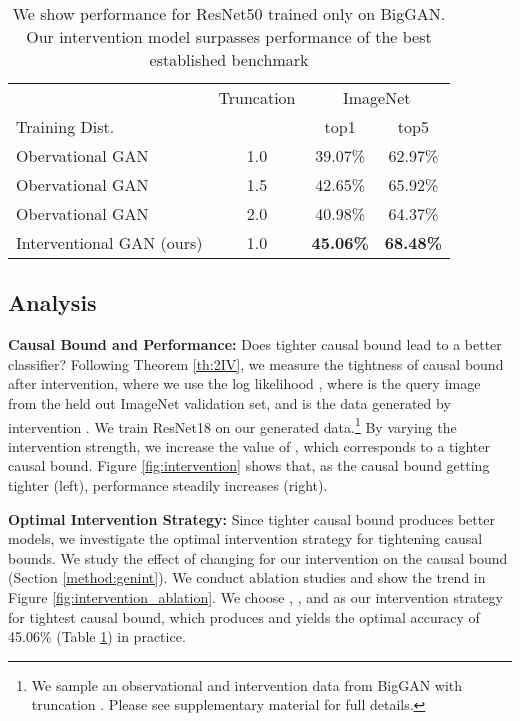\documentclass[final]{cvpr}
\begin{document}
\begin{table}
\centering
    \centering
    \scriptsize
    \begin{tabular}{lc|cc}
         \toprule
         & Truncation & \multicolumn{2}{c}{ImageNet}  \\
          Training Dist.& & top1&top5\\
         \midrule  
Obervational GAN \cite{CAS}  & 1.0 & 39.07\% & 62.97\%  \\
Obervational GAN \cite{CAS} & 1.5 & 42.65\% & 65.92\% \\
         Obervational GAN \cite{CAS} & 2.0 & 40.98\% & 64.37\%\\
         Interventional GAN (ours) & 1.0 & \textbf{45.06\%} & \textbf{68.48\%}\\
\bottomrule
    \end{tabular}
\vspace{3px}
\caption{We show performance for ResNet50 trained only on BigGAN. Our intervention model surpasses performance of the best established benchmark \cite{CAS}} \label{tab:CAS}
    \vspace{-5mm}
\end{table}

\subsection{Analysis}\label{sec:int_effect}





\textbf{Causal Bound and Performance:} Does tighter causal bound lead to a better classifier? Following Theorem \ref{th:2IV}, we measure the tightness of causal bound after intervention, where we use the log likelihood , where  is the query image from the held out ImageNet validation set, and  is the data generated by intervention . We train ResNet18 on our generated data.\footnote{We sample an observational and intervention data from BigGAN with truncation  \cite{BigGAN}.  Please see supplementary material for full details. }
By varying the intervention strength, we increase the value of , which corresponds to a tighter causal bound. Figure \ref{fig:intervention} shows that, as the causal bound getting tighter (left), performance steadily increases (right). 



\textbf{Optimal Intervention Strategy:} Since tighter causal bound produces better models, we investigate the optimal intervention strategy for tightening causal bounds. We study the effect of changing  for our intervention on the causal bound (Section \ref{method:genint}). We conduct ablation studies and show the trend in Figure \ref{fig:intervention_ablation}. We choose , , and  as our intervention strategy for tightest causal bound, which produces  and yields the optimal accuracy of 45.06\% (Table \ref{tab:CAS}) in practice.
\end{document}
